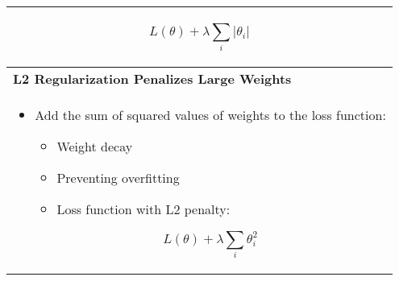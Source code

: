 \begin{summary}
\begin{center}
\begin{tabular}{l}
{\begin{itemize}
            \[
            L(\theta) + \lambda \sum_i |\theta_i|
            \]
        \end{itemize}} \\
        \midrule
        \textbf{L2 Regularization Penalizes Large Weights} \\
        \multicolumn{1}{p{\linewidth}}{
        \begin{itemize}
            \item Add the sum of squared values of weights to the loss function:
            \begin{itemize}
                \item Weight decay
                \item Preventing overfitting
                \item Loss function with L2 penalty:
            \end{itemize}
            \[
            L(\theta) + \lambda \sum_i \theta_i^2
            \]
        \end{itemize}} \\
        \bottomrule
        \end{tabular}
    \end{center}
\end{summary}
\newpage

